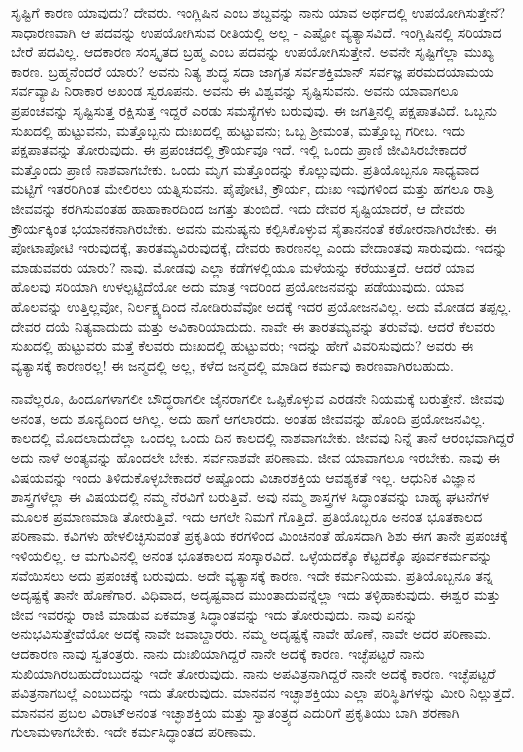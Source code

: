 ಸೃಷ್ಟಿಗೆ ಕಾರಣ ಯಾವುದು? ದೇವರು. ಇಂಗ್ಲಿಷಿನ  ಎಂಬ ಶಬ್ದವನ್ನು ನಾನು ಯಾವ ಅರ್ಥದಲ್ಲಿ ಉಪಯೋಗಿಸುತ್ತೇನೆ? ಸಾಧಾರಣವಾಗಿ ಆ ಪದವನ್ನು ಉಪಯೋಗಿಸುವ ರೀತಿಯಲ್ಲಿ ಅಲ್ಲ - ಎಷ್ಟೋ ವ್ಯತ್ಯಾಸವಿದೆ. ಇಂಗ್ಲಿಷಿನಲ್ಲಿ ಸರಿಯಾದ ಬೇರೆ ಪದವಿಲ್ಲ. ಆದಕಾರಣ ಸಂಸ್ಕೃತದ ಬ್ರಹ್ಮ ಎಂಬ ಪದವನ್ನು ಉಪಯೋಗಿಸುತ್ತೇನೆ. ಅವನೇ ಸೃಷ್ಟಿಗೆಲ್ಲಾ ಮುಖ್ಯ ಕಾರಣ. ಬ್ರಹ್ಮನೆಂದರೆ ಯಾರು? ಅವನು ನಿತ್ಯ ಶುದ್ಧ ಸದಾ ಜಾಗೃತ ಸರ್ವಶಕ್ತಿಮಾನ್​ ಸರ್ವಜ್ಞ ಪರಮದಯಾಮಯ ಸರ್ವವ್ಯಾಪಿ ನಿರಾಕಾರ ಅಖಂಡ ಸ್ವರೂಪನು. ಅವನು ಈ ವಿಶ್ವವನ್ನು ಸೃಷ್ಟಿಸುವನು. ಅವನು ಯಾವಾಗಲೂ ಪ್ರಪಂಚವನ್ನು ಸೃಷ್ಟಿಸುತ್ತ ರಕ್ಷಿಸುತ್ತ ಇದ್ದರೆ ಎರಡು ಸಮಸ್ಯೆಗಳು ಬರುವುವು. ಈ ಜಗತ್ತಿನಲ್ಲಿ ಪಕ್ಷಪಾತವಿದೆ. ಒಬ್ಬನು ಸುಖದಲ್ಲಿ ಹುಟ್ಟುವನು, ಮತ್ತೊಬ್ಬನು ದುಃಖದಲ್ಲಿ ಹುಟ್ಟುವನು; ಒಬ್ಬ ಶ‍್ರೀಮಂತ, ಮತ್ತೊಬ್ಬ ಗರೀಬ. ಇದು ಪಕ್ಷಪಾತವನ್ನು ತೋರುವುದು. ಈ ಪ್ರಪಂಚದಲ್ಲಿ ಕ್ರೌರ್ಯವೂ ಇದೆ. ಇಲ್ಲಿ ಒಂದು ಪ್ರಾಣಿ ಜೀವಿಸಿರಬೇಕಾದರೆ ಮತ್ತೊಂದು ಪ್ರಾಣಿ ನಾಶವಾಗಬೇಕು. ಒಂದು ಮೃಗ ಮತ್ತೊಂದನ್ನು ಕೊಲ್ಲುವುದು. ಪ್ರತಿಯೊಬ್ಬನೂ ಸಾಧ್ಯವಾದ ಮಟ್ಟಿಗೆ ಇತರರಿಗಿಂತ ಮೇಲಿರಲು ಯತ್ನಿಸುವನು. ಪೈಪೋಟಿ, ಕ್ರೌರ್ಯ, ದುಃಖ ಇವುಗಳಿಂದ ಮತ್ತು ಹಗಲೂ ರಾತ್ರಿ ಜೀವವನ್ನು ಕರಗಿಸುವಂತಹ ಹಾಹಾಕಾರದಿಂದ ಜಗತ್ತು ತುಂಬಿದೆ. ಇದು ದೇವರ ಸೃಷ್ಟಿಯಾದರೆ, ಆ ದೇವರು ಕ್ರೌರ್ಯಕ್ಕಿಂತ ಭಯಾನಕನಾಗಿರಬೇಕು. ಅವನು ಮನುಷ್ಯನು ಕಲ್ಪಿಸಿಕೊಳ್ಳುವ ಸೈತಾನನಂತೆ ಕಠೋರನಾಗಿರಬೇಕು. ಈ ಪೋಟಾಪೋಟಿ ಇರುವುದಕ್ಕೆ, ತಾರತಮ್ಯವಿರುವುದಕ್ಕೆ, ದೇವರು ಕಾರಣನಲ್ಲ ಎಂದು ವೇದಾಂತವು ಸಾರುವುದು. ಇದನ್ನು ಮಾಡುವವರು ಯಾರು? ನಾವು. ಮೋಡವು ಎಲ್ಲಾ ಕಡೆಗಳಲ್ಲಿಯೂ ಮಳೆಯನ್ನು ಕರೆಯುತ್ತದೆ. ಆದರೆ ಯಾವ ಹೊಲವು ಸರಿಯಾಗಿ ಉಳಲ್ಪಟ್ಟಿದೆಯೋ ಅದು ಮಾತ್ರ ಇದರಿಂದ ಪ್ರಯೋಜನವನ್ನು ಪಡೆಯುವುದು. ಯಾವ ಹೊಲವನ್ನು ಉತ್ತಿಲ್ಲವೋ, ನಿರ್ಲಕ್ಷ್ಯದಿಂದ ನೋಡಿರುವೆವೋ ಅದಕ್ಕೆ ಇದರ ಪ್ರಯೋಜನವಿಲ್ಲ. ಅದು ಮೋಡದ ತಪ್ಪಲ್ಲ. ದೇವರ ದಯೆ ನಿತ್ಯವಾದುದು ಮತ್ತು ಅವಿಕಾರಿಯಾದುದು. ನಾವೇ ಈ ತಾರತಮ್ಯವನ್ನು ತರುವೆವು. ಆದರೆ ಕೆಲವರು ಸುಖದಲ್ಲಿ ಹುಟ್ಟುವರು ಮತ್ತೆ ಕೆಲವರು ದುಃಖದಲ್ಲಿ ಹುಟ್ಟುವರು; ಇದನ್ನು ಹೇಗೆ ವಿವರಿಸುವುದು? ಅವರು ಈ ವ್ಯತ್ಯಾಸಕ್ಕೆ ಕಾರಣರಲ್ಲ! ಈ ಜನ್ಮದಲ್ಲಿ ಅಲ್ಲ, ಕಳೆದ ಜನ್ಮದಲ್ಲಿ ಮಾಡಿದ ಕರ್ಮವು ಕಾರಣವಾಗಿರಬಹುದು.

ನಾವೆಲ್ಲರೂ, ಹಿಂದೂಗಳಾಗಲೀ ಬೌದ್ಧರಾಗಲೀ ಜೈನರಾಗಲೀ ಒಪ್ಪಿಕೊಳ್ಳುವ ಎರಡನೇ ನಿಯಮಕ್ಕೆ ಬರುತ್ತೇನೆ. ಜೀವವು ಅನಂತ, ಅದು ಶೂನ್ಯದಿಂದ ಆಗಿಲ್ಲ. ಅದು ಹಾಗೆ ಆಗಲಾರದು. ಅಂತಹ ಜೀವವನ್ನು ಹೊಂದಿ ಪ್ರಯೋಜನವಿಲ್ಲ. ಕಾಲದಲ್ಲಿ ಮೊದಲಾದುದೆಲ್ಲಾ ಒಂದಲ್ಲ ಒಂದು ದಿನ ಕಾಲದಲ್ಲಿ ನಾಶವಾಗಬೇಕು. ಜೀವವು ನಿನ್ನೆ ತಾನೆ ಆರಂಭವಾಗಿದ್ದರೆ ಅದು ನಾಳೆ ಅಂತ್ಯವನ್ನು ಹೊಂದಲೇ ಬೇಕು. ಸರ್ವನಾಶವೇ ಪರಿಣಾಮ. ಜೀವ ಯಾವಾಗಲೂ ಇರಬೇಕು. ನಾವು ಈ ವಿಷಯವನ್ನು ಇಂದು ತಿಳಿದುಕೊಳ್ಳಬೇಕಾದರೆ ಅಷ್ಟೊಂದು ವಿಚಾರಶಕ್ತಿಯ ಆವಶ್ಯಕತೆ ಇಲ್ಲ. ಆಧುನಿಕ ವಿಜ್ಞಾನ ಶಾಸ್ತ್ರಗಳೆಲ್ಲಾ ಈ ವಿಷಯದಲ್ಲಿ ನಮ್ಮ ನೆರವಿಗೆ ಬರುತ್ತಿವೆ. ಅವು ನಮ್ಮ ಶಾಸ್ತ್ರಗಳ ಸಿದ್ಧಾಂತವನ್ನು ಬಾಹ್ಯ ಘಟನೆಗಳ ಮೂಲಕ ಪ್ರಮಾಣಮಾಡಿ ತೋರುತ್ತಿವೆ. ಇದು ಆಗಲೇ ನಿಮಗೆ ಗೊತ್ತಿದೆ. ಪ್ರತಿಯೊಬ್ಬರೂ ಅನಂತ ಭೂತಕಾಲದ ಪರಿಣಾಮ. ಕವಿಗಳು ಹೇಳಲಿಚ್ಛಿಸುವಂತೆ ಪ್ರಕೃತಿಯ ಕರಗಳಿಂದ ಮಿಂಚಿನಂತೆ ಹೊಸದಾಗಿ ಶಿಶು ಈಗ ತಾನೇ ಪ್ರಪಂಚಕ್ಕೆ ಇಳಿಯಲಿಲ್ಲ. ಆ ಮಗುವಿನಲ್ಲಿ ಅನಂತ ಭೂತಕಾಲದ ಸಂಸ್ಕಾರವಿದೆ. ಒಳ್ಳೆಯದಕ್ಕೊ ಕೆಟ್ಟದಕ್ಕೊ ಪೂರ್ವಕರ್ಮವನ್ನು ಸವೆಯಿಸಲು ಅದು ಪ್ರಪಂಚಕ್ಕೆ ಬರುವುದು. ಅದೇ ವ್ಯತ್ಯಾಸಕ್ಕೆ ಕಾರಣ. ಇದೇ ಕರ್ಮನಿಯಮ. ಪ್ರತಿಯೊಬ್ಬನೂ ತನ್ನ ಅದೃಷ್ಟಕ್ಕೆ ತಾನೇ ಹೊಣೆಗಾರ. ವಿಧಿವಾದ, ಅದೃಷ್ಟವಾದ ಮುಂತಾದುವನ್ನೆಲ್ಲಾ ಇದು ತಳ್ಳಿಹಾಕುವುದು. ಈಶ್ವರ ಮತ್ತು ಜೀವ ಇವರನ್ನು ರಾಜಿ ಮಾಡುವ ಏಕಮಾತ್ರ ಸಿದ್ಧಾಂತವನ್ನು ಇದು ತೋರುವುದು. ನಾವು ಏನನ್ನು ಅನುಭವಿಸುತ್ತೇವೆಯೋ ಅದಕ್ಕೆ ನಾವೇ ಜವಾಬ್ದಾರರು. ನಮ್ಮ ಅದೃಷ್ಟಕ್ಕೆ ನಾವೇ ಹೊಣೆ, ನಾವೇ ಅದರ ಪರಿಣಾಮ. ಆದಕಾರಣ ನಾವು ಸ್ವತಂತ್ರರು. ನಾನು ದುಃಖಿಯಾಗಿದ್ದರೆ ನಾನೇ ಅದಕ್ಕೆ ಕಾರಣ. ಇಚ್ಛೆಪಟ್ಟರೆ ನಾನು ಸುಖಿಯಾಗಿರಬಹುದೆಂಬುದನ್ನು ಇದೇ ತೋರುವುದು. ನಾನು ಅಪವಿತ್ರನಾಗಿದ್ದರೆ ನಾನೇ ಅದಕ್ಕೆ ಕಾರಣ. ಇಚ್ಛೆಪಟ್ಟರೆ ಪವಿತ್ರನಾಗಬಲ್ಲೆ ಎಂಬುದನ್ನು ಇದು ತೋರುವುದು. ಮಾನವನ ಇಚ್ಛಾಶಕ್ತಿಯು ಎಲ್ಲಾ ಪರಿಸ್ಥಿತಿಗಳನ್ನು ಮೀರಿ ನಿಲ್ಲುತ್ತದೆ. ಮಾನವನ ಪ್ರಬಲ ವಿರಾಟ್​ ಅನಂತ ಇಚ್ಛಾಶಕ್ತಿಯ ಮತ್ತು ಸ್ವಾತಂತ್ರ್ಯದ ಎದುರಿಗೆ ಪ್ರಕೃತಿಯು ಬಾಗಿ ಶರಣಾಗಿ ಗುಲಾಮಳಾಗಬೇಕು. ಇದೇ ಕರ್ಮಸಿದ್ಧಾಂತದ ಪರಿಣಾಮ.

